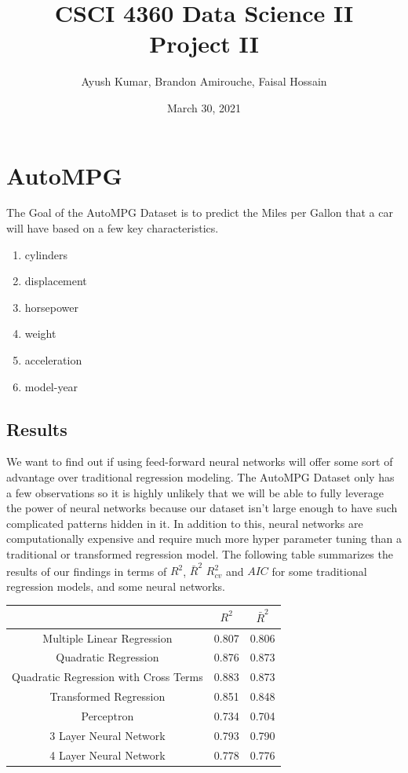 \documentclass{article}
\title{CSCI 4360 Data Science II \protect\\ Project II}
\author{Ayush Kumar, Brandon Amirouche, Faisal Hossain}
\date{March 30, 2021}
\begin{document}
 
	
	\maketitle
	\tableofcontents
	\newpage
	
	\section{AutoMPG}
	
	The Goal of the AutoMPG Dataset is to predict the Miles per Gallon that a car will have 
	based on a few key characteristics. 
	
	\begin{enumerate}
		\item cylinders 
		\item displacement 
		\item horsepower 
		\item weight 
		\item acceleration 
		\item model-year
	\end{enumerate}

	\subsection{Results}

	We want to find out if using feed-forward neural networks will offer some sort of advantage over 
	traditional regression modeling. The AutoMPG Dataset only has a few observations so it is highly 
	unlikely that we will be able to fully leverage the power of neural networks because our dataset 
	isn't large enough to have such complicated patterns hidden in it. In addition to this, neural networks 
	are computationally expensive and require much more hyper parameter tuning than a traditional or 
	transformed regression model. The following table summarizes the results of our findings in terms 
	of $R^2$, $\bar R^2$ $R^2_{cv}$ and $AIC$ for some traditional regression models, and some neural networks. 
	

	\begin{tabular}{|c|c|c|}
		\hline
		& $R^2$ & $\bar R^2$ \\ \hline
		Multiple Linear Regression            & 0.807 & 0.806      \\ \hline
		Quadratic Regression                  & 0.876 & 0.873      \\ \hline
		Quadratic Regression with Cross Terms & 0.883 & 0.873      \\ \hline
		Transformed Regression                & 0.851 & 0.848      \\ \hline
		Perceptron                            & 0.734 & 0.704      \\ \hline
		3 Layer Neural Network                & 0.793 & 0.790      \\ \hline
		4 Layer Neural Network                & 0.778 & 0.776      \\ \hline
	\end{tabular}
\end{document}
